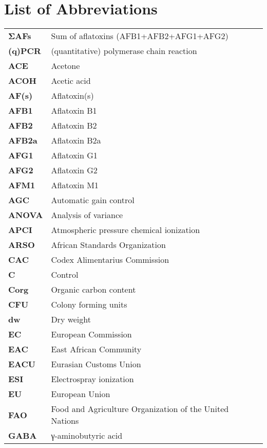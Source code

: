 \section{List of Abbreviations}

\begin{normalsize}
\begin{longtable}{ll}
\textbf{ΣAFs} & Sum of aflatoxins (AFB1+AFB2+AFG1+AFG2)\\
\textbf{(q)PCR} & (quantitative) polymerase chain reaction\\
\textbf{ACE} & Acetone\\
\textbf{ACOH} & Acetic acid\\
\textbf{AF(s)} & Aflatoxin(s)\\
\textbf{AFB1} & Aflatoxin B1\\
\textbf{AFB2} & Aflatoxin B2\\
\textbf{AFB2a} & Aflatoxin B2a\\
\textbf{AFG1} & Aflatoxin G1\\
\textbf{AFG2} & Aflatoxin G2\\
\textbf{AFM1} & Aflatoxin M1\\
\textbf{AGC} & Automatic gain control\\
\textbf{ANOVA} & Analysis of variance\\
\textbf{APCI} & Atmospheric pressure chemical ionization\\
\textbf{ARSO} & African Standards Organization\\
\textbf{CAC} & Codex Alimentarius Commission\\
\textbf{C} & Control\\
\textbf{Corg} & Organic carbon content\\
\textbf{CFU} & Colony forming units\\
\textbf{dw} & Dry weight\\
\textbf{EC} & European Commission\\
\textbf{EAC} & East African Community\\
\textbf{EACU} & Eurasian Customs Union\\
\textbf{ESI} & Electrospray ionization\\
\textbf{EU} & European Union\\
\textbf{FAO} & Food and Agriculture Organization of the United Nations\\
\textbf{GABA} & γ-aminobutyric acid\\

\end{longtable}
\end{normalsize}
